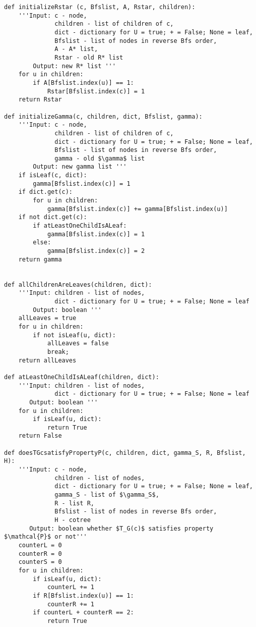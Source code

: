 \documentclass[12pt,a4paper,twoside]{article}
\theoremstyle{definition} %
\theoremstyle{plain} %
\numberwithin{equation}{section}  %
\begin{document}
\begin{verbatim}
def initializeRstar (c, Bfslist, A, Rstar, children):
    '''Input: c - node,
              children - list of children of c,
              dict - dictionary for U = true; + = False; None = leaf,
              Bfslist - list of nodes in reverse Bfs order,
              A - A* list,
              Rstar - old R* list
        Output: new R* list '''
    for u in children:
        if A[Bfslist.index(u)] == 1:
            Rstar[Bfslist.index(c)] = 1
    return Rstar

def initializeGamma(c, children, dict, Bfslist, gamma):
    '''Input: c - node,
              children - list of children of c,
              dict - dictionary for U = true; + = False; None = leaf,
              Bfslist - list of nodes in reverse Bfs order,
              gamma - old $\gamma$ list
        Output: new gamma list '''
    if isLeaf(c, dict):
        gamma[Bfslist.index(c)] = 1
    if dict.get(c):
        for u in children:
            gamma[Bfslist.index(c)] += gamma[Bfslist.index(u)]
    if not dict.get(c):
        if atLeastOneChildIsALeaf:
            gamma[Bfslist.index(c)] = 1
        else:
            gamma[Bfslist.index(c)] = 2
    return gamma
        

def allChildrenAreLeaves(children, dict):
    '''Input: children - list of nodes,
              dict - dictionary for U = true; + = False; None = leaf
        Output: boolean '''
    allLeaves = true
    for u in children:
        if not isLeaf(u, dict):
            allLeaves = false
            break;
    return allLeaves

def atLeastOneChildIsALeaf(children, dict):
    '''Input: children - list of nodes,
              dict - dictionary for U = true; + = False; None = leaf
       Output: boolean '''
    for u in children:
        if isLeaf(u, dict):
            return True
    return False

def doesTGcsatisfyPropertyP(c, children, dict, gamma_S, R, Bfslist, H):
    '''Input: c - node, 
              children - list of nodes,
              dict - dictionary for U = true; + = False; None = leaf,
              gamma_S - list of $\gamma_S$,
              R - list R,
              Bfslist - list of nodes in reverse Bfs order,
              H - cotree
       Output: boolean whether $T_G(c)$ satisfies property $\mathcal{P}$ or not'''
    counterL = 0
    counterR = 0
    counterS = 0
    for u in children:
        if isLeaf(u, dict):
            counterL += 1
        if R[Bfslist.index(u)] == 1:
            counterR += 1
        if counterL + counterR == 2:
            return True
        

\end{verbatim}
\end{document}
